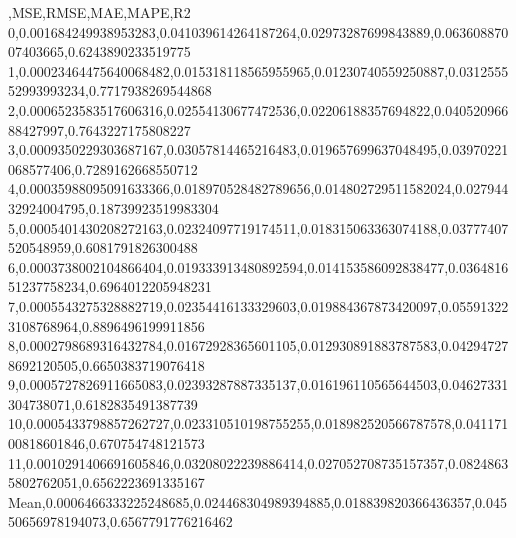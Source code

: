 ,MSE,RMSE,MAE,MAPE,R2
0,0.001684249938953283,0.041039614264187264,0.02973287699843889,0.06360887007403665,0.6243890233519775
1,0.00023464475640068482,0.015318118565955965,0.01230740559250887,0.031255552993993234,0.7717938269544868
2,0.0006523583517606316,0.02554130677472536,0.02206188357694822,0.04052096688427997,0.7643227175808227
3,0.0009350229303687167,0.03057814465216483,0.019657699637048495,0.03970221068577406,0.7289162668550712
4,0.00035988095091633366,0.018970528482789656,0.014802729511582024,0.02794432924004795,0.18739923519983304
5,0.0005401430208272163,0.02324097719174511,0.018315063363074188,0.03777407520548959,0.6081791826300488
6,0.0003738002104866404,0.019333913480892594,0.014153586092838477,0.036481651237758234,0.6964012205948231
7,0.0005543275328882719,0.02354416133329603,0.019884367873420097,0.055913223108768964,0.8896496199911856
8,0.0002798689316432784,0.01672928365601105,0.012930891883787583,0.042947278692120505,0.6650383719076418
9,0.0005727826911665083,0.02393287887335137,0.016196110565644503,0.04627331304738071,0.6182835491387739
10,0.0005433798857262727,0.023310510198755255,0.018982520566787578,0.04117100818601846,0.670754748121573
11,0.0010291406691605846,0.03208022239886414,0.027052708735157357,0.08248635802762051,0.6562223691335167
Mean,0.0006466333225248685,0.024468304989394885,0.018839820366436357,0.04550656978194073,0.6567791776216462

